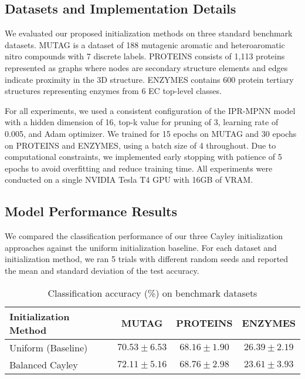 \documentclass[11pt,a4paper]{article}
\begin{document}
\subsection{Datasets and Implementation Details}

We evaluated our proposed initialization methods on three standard benchmark datasets. MUTAG is a dataset of 188 mutagenic aromatic and heteroaromatic nitro compounds with 7 discrete labels. PROTEINS consists of 1,113 proteins represented as graphs where nodes are secondary structure elements and edges indicate proximity in the 3D structure. ENZYMES contains 600 protein tertiary structures representing enzymes from 6 EC top-level classes.

For all experiments, we used a consistent configuration of the IPR-MPNN model with a hidden dimension of 16, top-k value for pruning of 3, learning rate of 0.005, and Adam optimizer. We trained for 15 epochs on MUTAG and 30 epochs on PROTEINS and ENZYMES, using a batch size of 4 throughout. Due to computational constraints, we implemented early stopping with patience of 5 epochs to avoid overfitting and reduce training time. All experiments were conducted on a single NVIDIA Tesla T4 GPU with 16GB of VRAM.

\subsection{Model Performance Results}

We compared the classification performance of our three Cayley initialization approaches against the uniform initialization baseline. For each dataset and initialization method, we ran 5 trials with different random seeds and reported the mean and standard deviation of the test accuracy.

\begin{table}[htb]
\centering
\caption{Classification accuracy (\%) on benchmark datasets}
\label{tab:classification_results}
\begin{tabular}{lccc}
\toprule
Initialization Method & MUTAG & PROTEINS & ENZYMES \\
\midrule
Uniform (Baseline) & $70.53 \pm 6.53$ & $68.16 \pm 1.90$ & $26.39 \pm 2.19$ \\
Balanced Cayley & $\mathbf{72.11 \pm 5.16}$ & $\mathbf{68.76 \pm 2.98}$ & $23.61 \pm 3.93$ \\
\bottomrule
\end{tabular}
\end{table}
\end{document}
